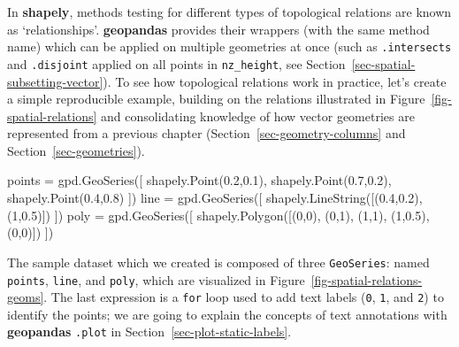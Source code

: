 \documentclass[
  letterpaper,
]{krantz}
\newenvironment{Shaded}{\begin{snugshade}}{\end{snugshade}}
\newcommand{\DecValTok}[1]{\textcolor[rgb]{0.68,0.00,0.00}{#1}}
\newcommand{\FloatTok}[1]{\textcolor[rgb]{0.68,0.00,0.00}{#1}}
\newcommand{\NormalTok}[1]{\textcolor[rgb]{0.00,0.23,0.31}{#1}}
\newcommand{\OperatorTok}[1]{\textcolor[rgb]{0.37,0.37,0.37}{#1}}
\begin{document}
In \textbf{shapely}, methods testing for different types of topological
relations are known as `relationships'. \textbf{geopandas} provides
their wrappers (with the same method name) which can be applied on
multiple geometries at once (such as \texttt{.intersects} and
\texttt{.disjoint} applied on all points in \texttt{nz\_height}, see
Section~\ref{sec-spatial-subsetting-vector}). To see how topological
relations work in practice, let's create a simple reproducible example,
building on the relations illustrated in
Figure~\ref{fig-spatial-relations} and consolidating knowledge of how
vector geometries are represented from a previous chapter
(Section~\ref{sec-geometry-columns} and Section~\ref{sec-geometries}).

\begin{Shaded}
\begin{Highlighting}[]
\NormalTok{points }\OperatorTok{=}\NormalTok{ gpd.GeoSeries([}
\NormalTok{  shapely.Point(}\FloatTok{0.2}\NormalTok{,}\FloatTok{0.1}\NormalTok{), }
\NormalTok{  shapely.Point(}\FloatTok{0.7}\NormalTok{,}\FloatTok{0.2}\NormalTok{), }
\NormalTok{  shapely.Point(}\FloatTok{0.4}\NormalTok{,}\FloatTok{0.8}\NormalTok{)}
\NormalTok{])}
\NormalTok{line }\OperatorTok{=}\NormalTok{ gpd.GeoSeries([}
\NormalTok{  shapely.LineString([(}\FloatTok{0.4}\NormalTok{,}\FloatTok{0.2}\NormalTok{), (}\DecValTok{1}\NormalTok{,}\FloatTok{0.5}\NormalTok{)])}
\NormalTok{])}
\NormalTok{poly }\OperatorTok{=}\NormalTok{ gpd.GeoSeries([}
\NormalTok{  shapely.Polygon([(}\DecValTok{0}\NormalTok{,}\DecValTok{0}\NormalTok{), (}\DecValTok{0}\NormalTok{,}\DecValTok{1}\NormalTok{), (}\DecValTok{1}\NormalTok{,}\DecValTok{1}\NormalTok{), (}\DecValTok{1}\NormalTok{,}\FloatTok{0.5}\NormalTok{), (}\DecValTok{0}\NormalTok{,}\DecValTok{0}\NormalTok{)])}
\NormalTok{])}
\end{Highlighting}
\end{Shaded}

The sample dataset which we created is composed of three
\texttt{GeoSeries}: named \texttt{points}, \texttt{line}, and
\texttt{poly}, which are visualized in
Figure~\ref{fig-spatial-relations-geoms}. The last expression is a
\texttt{for} loop used to add text labels (\texttt{0}, \texttt{1}, and
\texttt{2}) to identify the points; we are going to explain the concepts
of text annotations with \textbf{geopandas} \texttt{.plot} in
Section~\ref{sec-plot-static-labels}.
\end{document}
